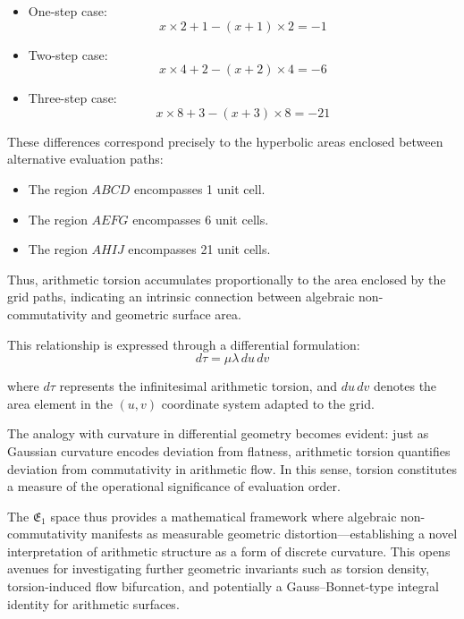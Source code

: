 \begin{itemize}
\item One-step case:
\begin{equation}
x \times 2 + 1 - (x + 1) \times 2 = -1
\end{equation}

\item Two-step case:
\begin{equation}
    x \times 4 + 2 - (x + 2) \times 4 = -6
\end{equation}

\item Three-step case:
\begin{equation}
    x \times 8 + 3 - (x + 3) \times 8 = -21
\end{equation}\end{itemize}

These differences correspond precisely to the hyperbolic areas enclosed between alternative evaluation paths:

\begin{itemize}
\item The region $ABCD$ encompasses 1 unit cell.
\item The region $AEFG$ encompasses 6 unit cells.
\item The region $AHIJ$ encompasses 21 unit cells.
\end{itemize}
Thus, arithmetic torsion accumulates proportionally to the area enclosed by the grid paths, indicating an intrinsic connection between algebraic non-commutativity and geometric surface area.

This relationship is expressed through a differential formulation:
\begin{equation}
d\tau = \mu \lambda\, du\, dv
\end{equation}

where $d\tau$ represents the infinitesimal arithmetic torsion, and $du\, dv$ denotes the area element in the $(u, v)$ coordinate system adapted to the grid.

The analogy with curvature in differential geometry becomes evident: just as Gaussian curvature encodes deviation from flatness, arithmetic torsion quantifies deviation from commutativity in arithmetic flow. In this sense, torsion constitutes a measure of the operational significance of evaluation order.

The $\mathfrak{E}_1$ space thus provides a mathematical framework where algebraic non-commutativity manifests as measurable geometric distortion—establishing a novel interpretation of arithmetic structure as a form of discrete curvature. This opens avenues for investigating further geometric invariants such as torsion density, torsion-induced flow bifurcation, and potentially a Gauss–Bonnet-type integral identity for arithmetic surfaces.


